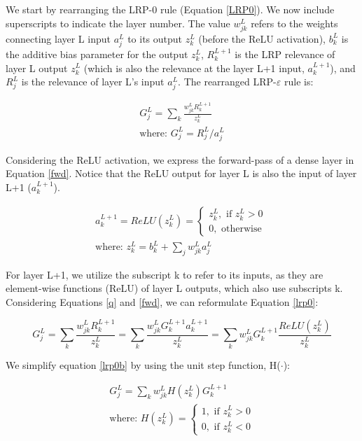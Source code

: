 \documentclass[fleqn,10pt]{wlscirep}
\begin{document}
{We start by rearranging the LRP-0 rule (Equation \ref{LRP0}). We now include superscripts to indicate the layer number. The value $w_{jk}^{L}$ refers to the weights connecting layer L input $a_{j}^{L}$ to its output $z_{k}^{L}$ (before the ReLU activation), $b_{k}^{L}$ is the additive bias parameter for the output $z_{k}^{L}$, $R_{k}^{L+1}$ is the LRP relevance of layer L output $z_{k}^{L}$ (which is also the relevance at the layer L+1 input, $a_{k}^{L+1}$), and $R_{j}^{L}$ is the relevance of layer L's input $a_{j}^{L}$. The rearranged LRP-$\varepsilon$ rule is:

\begin{gather}
\label{lrp0}
G_{j}^{L}=\sum_{k}\frac{w_{jk}^{L}R_{k}^{L+1}}{z_{k}^{L}}\\
\label{q}
\mbox{where: } G_{j}^{L}=R_{j}^{L}/a_{j}^{L}
\end{gather}

Considering the ReLU activation, we express the forward-pass of a dense layer in Equation \ref{fwd}. Notice that the ReLU output for layer L is also the input of layer L+1 ($a_{k}^{L+1}$).

\begin{gather}
\label{fwd}
a_{k}^{L+1}=ReLU(z_{k}^{L})=
\begin{cases}
z_{k}^{L}, \mbox{ if } z_{k}^{L} > 0 \\
0,  \mbox{ otherwise }
\end{cases}\\
\mbox{where: } z_{k}^{L}=b_{k}^{L}+\sum_{j} w_{jk}^{L}a_{j}^{L}
\end{gather}

For layer L+1, we utilize the subscript k to refer to its inputs, as they are element-wise functions (ReLU) of layer L outputs, which also use subscripts k. Considering Equations \ref{q} and \ref{fwd}, we can reformulate Equation \ref{lrp0}:

\begin{equation}
\label{lrp0b}
G_{j}^{L}=\sum_{k}\frac{w_{jk}^{L}R_{k}^{L+1}}{z_{k}^{L}}=
\sum_{k}\frac{w_{jk}^{L}G_{k}^{L+1}a_{k}^{L+1}}{z_{k}^{L}}=
\sum_{k}w_{jk}^{L}G_{k}^{L+1}\frac{ReLU(z_{k}^{L})}{z_{k}^{L}}
\end{equation}

We simplify equation \ref{lrp0b} by using the unit step function, H($\cdot$):

\begin{gather}
\label{QRule}
G_{j}^{L}=\sum_{k}w_{jk}^{L}H(z_{k}^{L})G_{k}^{L+1}\\
\mbox{where: } H(z_{k}^{L})=
\label{unitStep}
\begin{cases}
1, \mbox{ if } z_{k}^{L} > 0 \\
0, \mbox{ if } z_{k}^{L} < 0 
\end{cases}
\end{gather}

}
\end{document}
